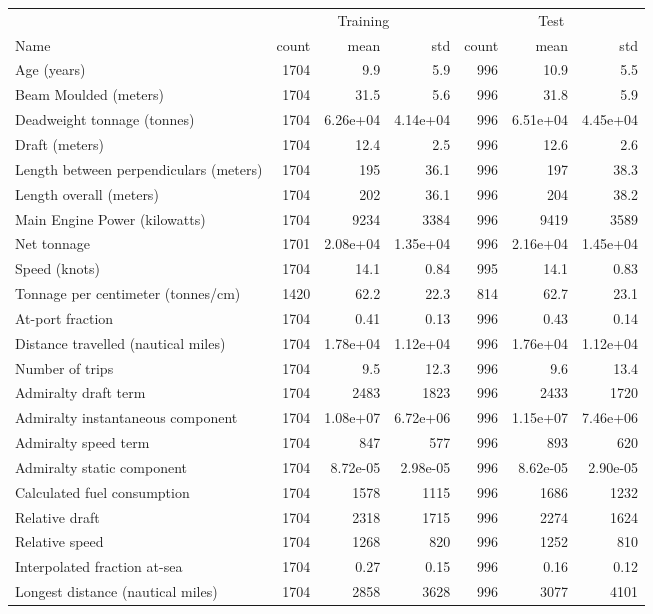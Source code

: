 
\begin{tabular}[t]{lrrrrrr}
\toprule
\multicolumn{1}{c}{ } & \multicolumn{3}{c}{Training} & \multicolumn{3}{c}{Test} \\
\cmidrule(l{3pt}r{3pt}){2-4} \cmidrule(l{3pt}r{3pt}){5-7}
Name & count & mean & std & count & mean & std\\
\midrule
Age (years) & 1704 & 9.9 & 5.9 & 996 & 10.9 & 5.5\\
Beam Moulded (meters) & 1704 & 31.5 & 5.6 & 996 & 31.8 & 5.9\\
Deadweight tonnage (tonnes) & 1704 & 6.26e+04 & 4.14e+04 & 996 & 6.51e+04 & 4.45e+04\\
Draft (meters) & 1704 & 12.4 & 2.5 & 996 & 12.6 & 2.6\\
Length between perpendiculars (meters) & 1704 & 195 & 36.1 & 996 & 197 & 38.3\\
\addlinespace
Length overall (meters) & 1704 & 202 & 36.1 & 996 & 204 & 38.2\\
Main Engine Power (kilowatts) & 1704 & 9234 & 3384 & 996 & 9419 & 3589\\
Net tonnage & 1701 & 2.08e+04 & 1.35e+04 & 996 & 2.16e+04 & 1.45e+04\\
Speed (knots) & 1704 & 14.1 & 0.84 & 995 & 14.1 & 0.83\\
Tonnage per centimeter (tonnes/cm) & 1420 & 62.2 & 22.3 & 814 & 62.7 & 23.1\\
\addlinespace
At-port fraction & 1704 & 0.41 & 0.13 & 996 & 0.43 & 0.14\\
Distance travelled (nautical miles) & 1704 & 1.78e+04 & 1.12e+04 & 996 & 1.76e+04 & 1.12e+04\\
Number of trips & 1704 & 9.5 & 12.3 & 996 & 9.6 & 13.4\\
Admiralty draft term & 1704 & 2483 & 1823 & 996 & 2433 & 1720\\
Admiralty instantaneous component & 1704 & 1.08e+07 & 6.72e+06 & 996 & 1.15e+07 & 7.46e+06\\
\addlinespace
Admiralty speed term & 1704 & 847 & 577 & 996 & 893 & 620\\
Admiralty static component & 1704 & 8.72e-05 & 2.98e-05 & 996 & 8.62e-05 & 2.90e-05\\
Calculated fuel consumption & 1704 & 1578 & 1115 & 996 & 1686 & 1232\\
Relative draft & 1704 & 2318 & 1715 & 996 & 2274 & 1624\\
Relative speed & 1704 & 1268 & 820 & 996 & 1252 & 810\\
\addlinespace
Interpolated fraction at-sea & 1704 & 0.27 & 0.15 & 996 & 0.16 & 0.12\\
Longest distance (nautical miles) & 1704 & 2858 & 3628 & 996 & 3077 & 4101\\
\bottomrule
\end{tabular}
